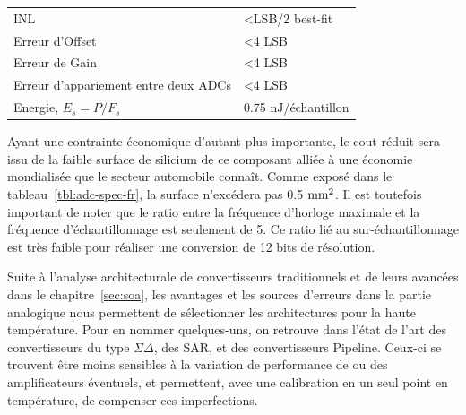 \begin{mdframed}[linecolor=Prune,linewidth=1]
\begin{center}
\begin{tabular}{ll}
        INL                              & \textless LSB/2 best-fit                                                                                                                             \\
        Erreur d'Offset                     & \textless 4 LSB                                                                                                                                             \\
        Erreur de Gain                       & \textless 4 LSB                                                                                                                                             \\
        Erreur d'appariement entre deux ADCs      & \textless 4 LSB                                                                                                                                             \\
        Energie, $E_s = P/F_s$            & 0.75 nJ/échantillon      \\ \bottomrule                                                                                                                                       
        \end{tabular}
    \end{center}

    Ayant une contrainte économique d’autant plus importante, le cout réduit sera issu de la faible surface de silicium de ce composant alliée à une économie mondialisée que le secteur automobile connaît. Comme exposé dans le tableau~\ref{tbl:adc-spec-fr}, la surface n’excédera pas 0.5 $\rm mm^2$. Il est toutefois important de noter que le ratio entre la fréquence d'horloge maximale et la fréquence d'échantillonnage est seulement de 5. Ce ratio lié au sur-échantillonnage est très faible pour réaliser une conversion de 12 bits de résolution.
    
    Suite à l’analyse architecturale de convertisseurs traditionnels et de leurs avancées dans le chapitre~\ref{sec:soa}, les avantages et les sources d’erreurs dans la partie analogique nous permettent de sélectionner les architectures pour la haute température. Pour en nommer quelques-uns, on retrouve dans l’état de l’art des convertisseurs du type \(\Sigma \Delta\), des SAR, et des convertisseurs Pipeline. Ceux-ci se trouvent être moins sensibles à la variation de performance de ou des amplificateurs éventuels, et permettent, avec une calibration en un seul point en température, de compenser ces imperfections.
    

\end{mdframed}
